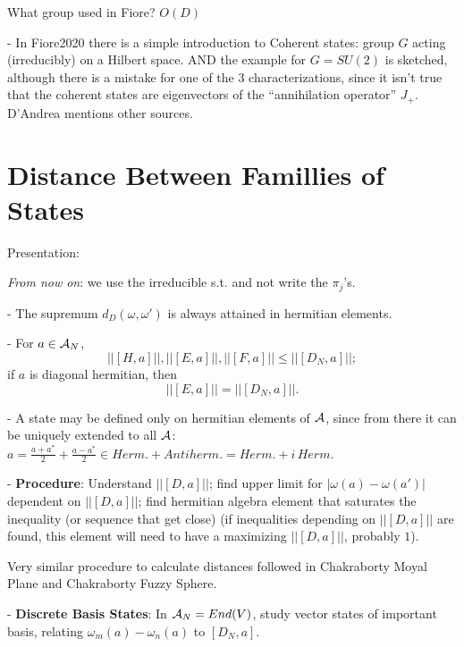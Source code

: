 What group used in Fiore? $O(D)$

- In Fiore2020 there is a simple introduction to Coherent states: group $G$ acting (irreducibly) on a Hilbert space. AND the example for $G = SU(2)$ is sketched, although there is a mistake for one of the $3$ characterizations, since it isn't true that the coherent states are eigenvectors of the ``annihilation operator'' $J_+$. D'Andrea mentions other sources.

\linea
\section{Distance Between Famillies of  States}

Presentation:

\textit{From now on}: we use the irreducible s.t. and not write the $\pi_j$'s.

- The supremum $d_D(\omega, \omega')$ is always attained in hermitian elements.

- For $a \in \mathcal A_N$, 
\begin{equation} \label{ineqDN}
    ||[H, a]||, ||[E, a]||, ||[F, a]||  \leq ||[D_N, a]||;
\end{equation} \label{eqDNdiag}
if $a$ is diagonal hermitian, then
\begin{equation}
    ||[E, a]|| = ||[D_N, a]||.
\end{equation}

- A state may be defined only on hermitian elements of $\mathcal A$, since from there it can be uniquely extended to all $\mathcal A$: $a = \frac{a+a^*}{2} + \frac{a - a^*}{2} \in Herm. + Antiherm. = Herm. + i\, Herm.$

\linea

- \textbf{Procedure}: Understand $||[D, a]||$; find upper limit for $|\omega(a) - \omega(a')|$ dependent on $||[D, a]||$; find hermitian algebra element that saturates the inequality (or sequence that get close) (if inequalities depending on $||[D, a]||$ are found, this element will need to have a maximizing $||[D, a]||$, probably $1$). 

Very similar procedure to calculate distances followed in Chakraborty Moyal Plane and Chakraborty Fuzzy Sphere.

- \textbf{Discrete Basis States}: In $\mathcal A_N = End(V)$, study vector states of important basis, relating $\omega_m(a) - \omega_n(a)$ to $[D_N, a]$.

